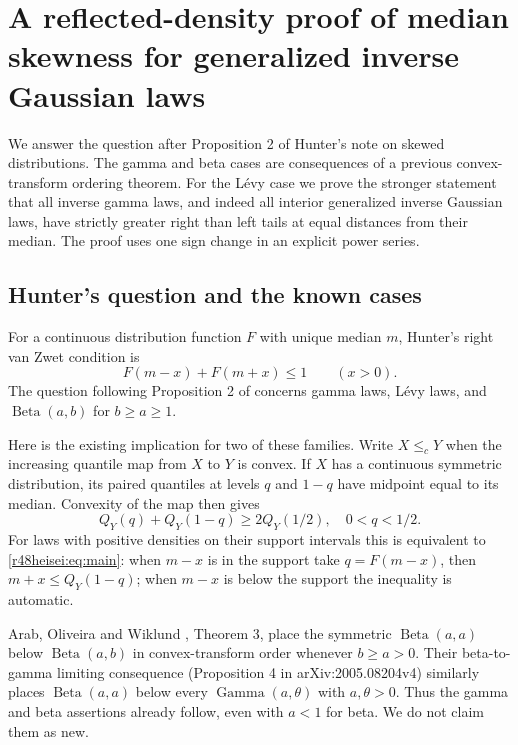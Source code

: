 \documentclass[11pt,a4paper]{article}
\numberwithin{equation}{section}
\theoremstyle{definition}
\theoremstyle{remark}
\newenvironment{sectionabstract}{\par\smallskip\begingroup\small\noindent}{\par\endgroup\medskip}
\begin{document}
\section{\texorpdfstring{A reflected-density proof of median skewness for generalized inverse Gaussian laws}{A reflected-density proof of median skewness for generalized inverse Gaussian laws}}\label{section:r48heisei}
\par\medskip


\begin{sectionabstract}
We answer the question after Proposition 2 of Hunter's note on skewed distributions. The gamma and beta cases are consequences of a previous convex-transform ordering theorem. For the L\'evy case we prove the stronger statement that all inverse gamma laws, and indeed all interior generalized inverse Gaussian laws, have strictly greater right than left tails at equal distances from their median. The proof uses one sign change in an explicit power series.
\end{sectionabstract}

\subsection{Hunter's question and the known cases}
For a continuous distribution function $F$ with unique median $m$, Hunter's right van Zwet condition \cite{r48heisei:hunter} is
\begin{equation}
 F(m-x)+F(m+x)\le1\qquad(x>0).
 \label{r48heisei:eq:main}
\end{equation}
The question following Proposition 2 of \cite{r48heisei:hunter} concerns gamma laws, L\'evy laws, and $\operatorname{Beta}(a,b)$ for $b\ge a\ge1$.

Here is the existing implication for two of these families.
Write $X\le_c Y$ when the increasing quantile map from $X$ to $Y$ is convex. If $X$ has a continuous symmetric distribution, its paired quantiles at levels $q$ and $1-q$ have midpoint equal to its median. Convexity of the map then gives
\[
 Q_Y(q)+Q_Y(1-q)\ge2Q_Y(1/2),\quad 0<q<1/2.
\]
For laws with positive densities on their support intervals this is equivalent to \eqref{r48heisei:eq:main}: when $m-x$ is in the support take $q=F(m-x)$, then $m+x\le Q_Y(1-q)$; when $m-x$ is below the support the inequality is automatic.

Arab, Oliveira and Wiklund \cite{r48heisei:aow}, Theorem 3, place the symmetric $\operatorname{Beta}(a,a)$ below $\operatorname{Beta}(a,b)$ in convex-transform order whenever $b\ge a>0$. Their beta-to-gamma limiting consequence (Proposition 4 in arXiv:2005.08204v4) similarly places $\operatorname{Beta}(a,a)$ below every $\operatorname{Gamma}(a,\theta)$ with $a,\theta>0$. Thus the gamma and beta assertions already follow, even with $a<1$ for beta. We do not claim them as new.
\end{document}
